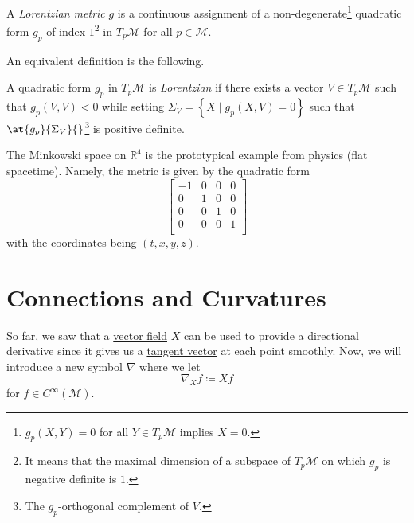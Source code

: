 \begin{definition}\label{def:Lorentzian-metric}
	A \emph{Lorentzian metric} \(g\) is a continuous assignment of a non-degenerate\footnote{\(g_p(X, Y) = 0\) for all \(Y\in T_p \mathcal{M} \) implies \(X = 0\).} quadratic form \(g_p\) of index \(1\)\footnote{It means that the maximal dimension of a subspace of \(T_p \mathcal{M} \) on which \(g_p\) is negative definite is \(1\).} in \(T_p \mathcal{M} \) for all \(p\in \mathcal{M} \).
\end{definition}

An equivalent definition is the following.

\begin{definition}[Lorentzian]\label{def:Lorentzian}
	A quadratic form \(g_p\) in \(T_{p} \mathcal{M} \) is \emph{Lorentzian} if there exists a vector \(V\in T_p \mathcal{M} \) such that \(g_p(V, V) < 0\) while setting \(\Sigma _V = \left\{ X \mid g_p(X, V) = 0 \right\}\) such that \(\at{g_p}{\Sigma _V}{} \)\footnote{The \(g_p\)-orthogonal complement of \(V\).} is positive definite.
\end{definition}

\begin{eg}
	The Minkowski space on \(\mathbb{R} ^4\) is the prototypical example from physics (flat spacetime). Namely, the metric is given by the quadratic form
	\[
		\begin{bmatrix}
			-1 & 0 & 0 & 0 \\
			0  & 1 & 0 & 0 \\
			0  & 0 & 1 & 0 \\
			0  & 0 & 0 & 1 \\
		\end{bmatrix}
	\]
	with the coordinates being \((t, x, y, z)\).
\end{eg}

\chapter{Connections and Curvatures}
So far, we saw that a \hyperref[def:vector-field]{vector field} \(X\) can be used to provide a directional derivative since it gives us a \hyperref[def:tangent-vector]{tangent vector} at each point smoothly. Now, we will introduce a new symbol \(\nabla \) where we let
\[
	\nabla _X f\coloneqq Xf
\]
for \(f\in C^{\infty} (\mathcal{M} )\).

